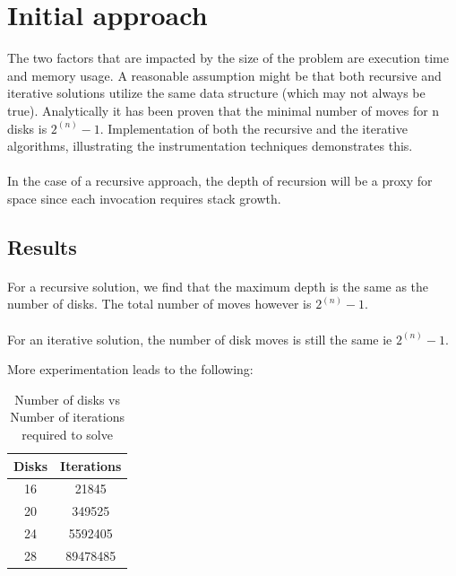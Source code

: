 \documentclass[a4paper,11pt]{article}
\theoremstyle{mytheor}
\begin{document}
\section*{Initial approach}

The two factors that are impacted by the size of the problem are execution time and memory usage. A reasonable assumption might be that both recursive and iterative solutions utilize the same data structure (which may not always be true). Analytically it has been proven that the minimal number of moves for n disks is $2^{(n)} - 1$. Implementation of both the recursive and the iterative algorithms, illustrating the instrumentation techniques demonstrates this.

\paragraph{}
 In the case of a recursive approach, the depth of recursion will be a proxy for space since each invocation requires stack growth.
 
\subsection*{Results}

\paragraph{}
For a recursive solution, we find that the maximum depth is the same as the number of disks. The total number of moves however is $2^{(n)} - 1$.


\paragraph{}
For an iterative solution, the number of disk moves is still the same ie $2^{(n)} - 1$.

More experimentation leads to the following:
\begin{table}[h!]
\begin{center}
\begin{tabular}{ | c | c | }
\hline
 Disks & Iterations \\
 \hline
 16 & 21845 \\ 
 20 & 349525 \\  
 24 & 5592405 \\
 28 & 89478485 \\
 \hline
\end{tabular}
\caption{Number of disks vs Number of iterations required to solve}
\label{table:1}
\end{center}

\end{table}
\end{document}
